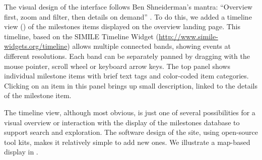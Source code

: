 The visual design of the
interface follows Ben Shneiderman's mantra: ``Overview first, zoom and filter, then details on demand''
\citep{Shneiderman:1996:IEEE}.
To do this, 
we added a timeline view () of the milestones items displayed on the overview
landing page. This timeline, based on the SIMILE Timeline Widget (\url{http://www.simile-widgets.org/timeline})
allows multiple connected bands, showing events at different resolutions.  Each band can be separately panned
by dragging with the mouse pointer, scroll wheel or keyboard arrow keys.  The top panel shows individual milestone
items with brief text tags and color-coded item categories.
Clicking on an item in this panel brings up small description, linked to the details of the milestone item.

The timeline view, although most obvious, is just one of several possibilities for a visual overview
or interaction with the display of the milestones database to support search and exploration.
The software design of the site, using open-source tool kits, makes it relatively simple to add new
ones.  We illustrate a map-based display in .



